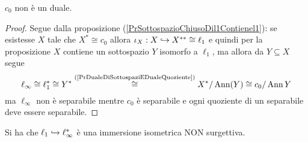 \begin{exercise}
$c_0$ non \`e un duale.
\end{exercise}
\begin{proof}
Segue dalla proposizione (\ref{PrSottospazioChiusoDil1Contienel1}): se esistesse $X$ tale che $X^\ast\cong c_0$ allora $\iota_X:X\hookrightarrow X^{\ast\ast}\cong \ell_1$ e quindi per la proposizione $X$ contiene un sottospazio $Y$ isomorfo a $\ell_1$, ma allora da $Y\subseteq X$ segue 
\[\ell_\infty\cong \ell_1^\ast\cong Y^\ast\overset{\text{(\ref{PrDualeDiSottospaziEDualeQuoziente})}}{\cong} X^\ast/\operatorname{Ann}(Y)\cong c_0/\operatorname{Ann} Y\]
ma $\ell_\infty$ non \`e separabile mentre $c_0$ \`e separabile e ogni quoziente di un separabile deve essere separabile.
\end{proof}


\begin{proposition}\label{PrDualelinftyContienel1}
Si ha che $\ell_1\hookrightarrow \ell_\infty^\ast$ \`e una immersione isometrica NON surgettiva.
\end{proposition}

